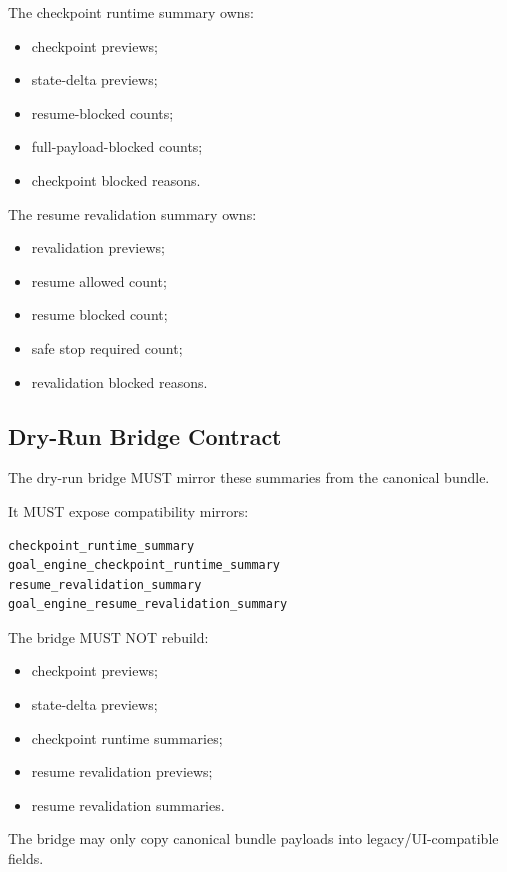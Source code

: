 The checkpoint runtime summary owns:

\begin{itemize}
  \item checkpoint previews;
  \item state-delta previews;
  \item resume-blocked counts;
  \item full-payload-blocked counts;
  \item checkpoint blocked reasons.
\end{itemize}

The resume revalidation summary owns:

\begin{itemize}
  \item revalidation previews;
  \item resume allowed count;
  \item resume blocked count;
  \item safe stop required count;
  \item revalidation blocked reasons.
\end{itemize}

\subsection{Dry-Run Bridge Contract}

The dry-run bridge MUST mirror these summaries from the canonical bundle.

It MUST expose compatibility mirrors:

\begin{verbatim}
checkpoint_runtime_summary
goal_engine_checkpoint_runtime_summary
resume_revalidation_summary
goal_engine_resume_revalidation_summary
\end{verbatim}

The bridge MUST NOT rebuild:

\begin{itemize}
  \item checkpoint previews;
  \item state-delta previews;
  \item checkpoint runtime summaries;
  \item resume revalidation previews;
  \item resume revalidation summaries.
\end{itemize}

The bridge may only copy canonical bundle payloads into legacy/UI-compatible fields.

